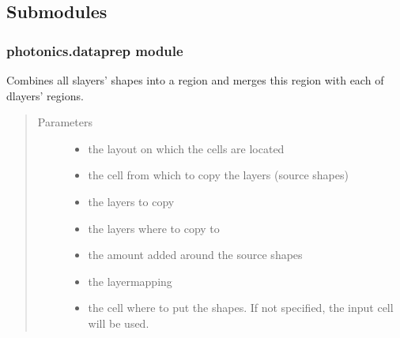 \documentclass[a4paper,10pt,english]{sphinxmanual}
\begin{document}
\subsection{Submodules}
\label{\detokenize{photonics:submodules}}

\subsubsection{photonics.dataprep module}
\label{\detokenize{photonics:module-photonics.dataprep}}\label{\detokenize{photonics:photonics-dataprep-module}}

\begin{fulllineitems}
\label{\detokenize{photonics:photonics.dataprep.add}}
Combines all slayers’ shapes into a region and merges this region with each of dlayers’ regions.
\begin{quote}\begin{description}
\item[{Parameters}] \leavevmode\begin{itemize}
\item {} 
 \textendash{} the layout on which the cells are located

\item {} 
 \textendash{} the cell from which to copy the layers (source shapes)

\item {} 
 \textendash{} the layers to copy

\item {} 
 \textendash{} the layers where to copy to

\item {} 
 \textendash{} the amount added around the source shapes

\item {} 
 \textendash{} the layermapping

\item {} 
 \textendash{} the cell where to put the shapes. If not specified, the input cell will be used.

\end{itemize}

\end{description}\end{quote}

\end{fulllineitems}
\end{document}
